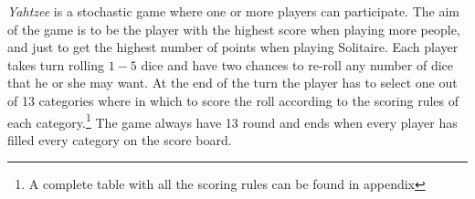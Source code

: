 \emph{Yahtzee} is a stochastic game where one or more players can participate. 
The aim of the game is to be the player with the highest score when playing more people, and just to get the highest number of points when playing Solitaire.
Each player takes turn rolling $1-5$ dice and have two chances to re-roll any number of dice that he or she may want. At the end of the turn the player has to select one out of 13 categories where in which to score the roll according to the scoring rules of each category.\footnote{A complete table with all the scoring rules can be found in appendix %
}
The game always have 13 round and ends when every player has filled every category on the score board.
